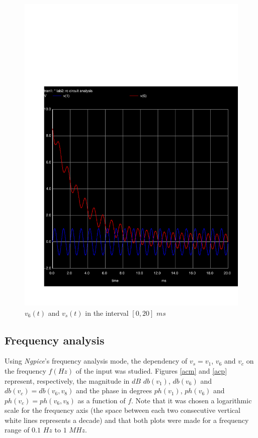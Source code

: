  \begin{figure}[h]
     \centering
         \includegraphics[scale = 0.55]{total.pdf}
         \caption{$v_{6}(t)$ and $v_{s}(t)$ in the interval $[0, 20]$ $ms$}
     \label{total}
 \end{figure}


\newpage
\subsection{Frequency analysis}

\vspace{5mm}
Using \textit{Ngpice}’s frequency analysis mode, the dependency of $v_s=v_1$, $v_6$ and $v_c$ on the frequency $f(Hz)$ of the input was studied. Figures \ref{acm} and \ref{acp} represent, respectively, the magnitude in $dB$ $db(v_1)$, $db(v_6)$ and $db(v_c)=db(v_6,v_8)$ and the phase in degrees $ph(v_1)$, $ph(v_6)$ and $ph(v_c)=ph(v_6,v_8)$ as a function of $f$. Note that it was chosen a logarithmic scale for the frequency axis (the space between each two consecutive vertical white lines represents a decade) and that both plots were made for a frequency range of $0.1$ $Hz$ to $1$ $MHz$.

